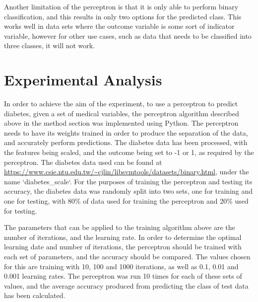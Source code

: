 \documentclass[10pt,twocolumn,a4paper]{article}
\begin{document}
Another limitation of the perceptron is that it is only able to perform binary classification, and this results in only two options for the predicted class. This works well in data sets where the outcome variable is some sort of indicator variable, however for other use cases, such as data that needs to be classified into three classes, it will not work.

\section{Experimental Analysis}

In order to achieve the aim of the experiment, to use a perceptron to predict diabetes, given a set of medical variables, the perceptron algorithm described above in the method section was implemented using Python.  The perceptron needs to have its weights trained in order to produce the separation of the data, and accurately perform predictions. The diabetes data has been processed, with the features being scaled, and the outcome being set to -1 or 1, as required by the perceptron. The diabetes data used can be found at \url{https://www.csie.ntu.edu.tw/~cjlin/libsvmtools/datasets/binary.html}, under the name `diabetes\_scale`. For the purposes of training the perceptron and testing its accuracy, the diabetes data was  randomly split into two sets, one for training and one for testing, with 80\% of data used for training the perceptron and 20\% used for testing.

The parameters that can be applied to the training algorithm above are the number of iterations, and the learning rate. In order to determine the optimal learning date and number of iterations, the perceptron should be trained with each set of parameters, and the accuracy should be compared. The values chosen for this are training with 10, 100 and 1000 iterations, as well as 0.1, 0.01 and 0.001 learning rates. The perceptron was run 10 times for each of these sets of values, and the average accuracy produced from predicting the class of test data has been calculated.
\end{document}
